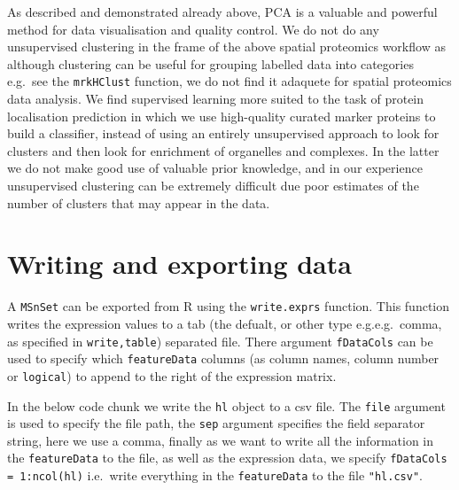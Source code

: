As described and demonstrated already above, PCA is a valuable and
powerful method for data visualisation and quality control. We do not do
any unsupervised clustering in the frame of the above spatial proteomics
workflow as although clustering can be useful for grouping labelled data
into categories e.g.~see the \texttt{mrkHClust} function, we do not find
it adaquete for spatial proteomics data analysis. We find supervised
learning more suited to the task of protein localisation prediction in
which we use high-quality curated marker proteins to build a classifier,
instead of using an entirely unsupervised approach to look for clusters
and then look for enrichment of organelles and complexes. In the latter
we do not make good use of valuable prior knowledge, and in our
experience unsupervised clustering can be extremely difficult due poor
estimates of the number of clusters that may appear in the data.

\section{Writing and exporting data}\label{writing-and-exporting-data}

A \texttt{MSnSet} can be exported from R using the \texttt{write.exprs}
function. This function writes the expression values to a tab (the
defualt, or other type e.g.e.g.~comma, as specified in
\texttt{write,table}) separated file. There argument \texttt{fDataCols}
can be used to specify which \texttt{featureData} columns (as column
names, column number or \texttt{logical}) to append to the right of the
expression matrix.

In the below code chunk we write the \texttt{hl} object to a csv file.
The \texttt{file} argument is used to specify the file path, the
\texttt{sep} argument specifies the field separator string, here we use
a comma, finally as we want to write all the information in the
\texttt{featureData} to the file, as well as the expression data, we
specify \texttt{fDataCols = 1:ncol(hl)} i.e.~write everything in the
\texttt{featureData} to the file \texttt{"hl.csv"}.

\begin{Shaded}
\begin{Highlighting}[]
 \NormalTok{, } \NormalTok{, }
             \NormalTok{:}
\end{Highlighting}
\end{Shaded}

